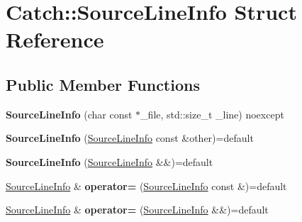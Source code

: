 \hypertarget{struct_catch_1_1_source_line_info}{}\section{Catch\+:\+:Source\+Line\+Info Struct Reference}
\label{struct_catch_1_1_source_line_info}
\subsection*{Public Member Functions}
\begin{DoxyCompactItemize}
\item 
\mbox{\label{struct_catch_1_1_source_line_info_a48510b82a39a042ab370ed143dd30c10}} 
{\bfseries Source\+Line\+Info} (char const $\ast$\+\_\+file, std\+::size\+\_\+t \+\_\+line) noexcept
\item 
\mbox{\label{struct_catch_1_1_source_line_info_a7c44c9986c33a9cf842b791374332d41}} 
{\bfseries Source\+Line\+Info} (\mbox{\hyperlink{struct_catch_1_1_source_line_info}{Source\+Line\+Info}} const \&other)=default
\item 
\mbox{\label{struct_catch_1_1_source_line_info_a6614b503b493bbdd3b49a1bd732e0a55}} 
{\bfseries Source\+Line\+Info} (\mbox{\hyperlink{struct_catch_1_1_source_line_info}{Source\+Line\+Info}} \&\&)=default
\item 
\mbox{\label{struct_catch_1_1_source_line_info_a1a6cfc0197357ef4e329bb256aa8a354}} 
\mbox{\hyperlink{struct_catch_1_1_source_line_info}{Source\+Line\+Info}} \& {\bfseries operator=} (\mbox{\hyperlink{struct_catch_1_1_source_line_info}{Source\+Line\+Info}} const \&)=default
\item 
\mbox{\label{struct_catch_1_1_source_line_info_a7fa35372f2bca5e91adc25327b7c753c}} 
\mbox{\hyperlink{struct_catch_1_1_source_line_info}{Source\+Line\+Info}} \& {\bfseries operator=} (\mbox{\hyperlink{struct_catch_1_1_source_line_info}{Source\+Line\+Info}} \&\&)=default
\item 
\mbox{\label{struct_catch_1_1_source_line_info_a10a5b5b7dff82971879c2eb8d83f9b3b}} 

\end{DoxyCompactItemize}
